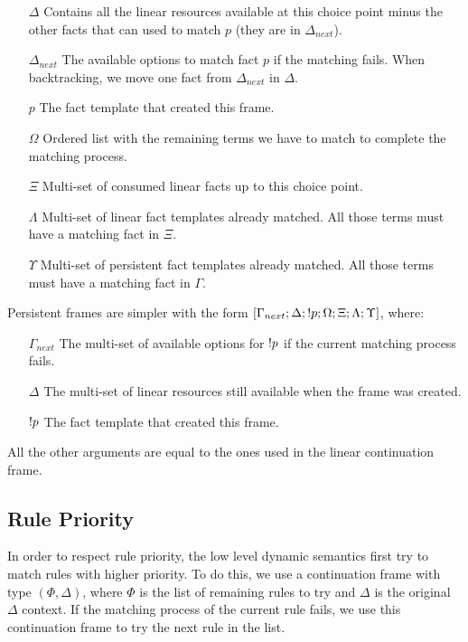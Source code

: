 \begin{enumerate}
   \item[$\Delta$] Contains all the linear resources available at this choice point minus the other facts that can used to match $p$ (they are in $\Delta_{next}$).
   \item[$\Delta_{next}$] The available options to match fact $p$ if the matching fails. When backtracking, we move one fact from $\Delta_{next}$ in $\Delta$.
   \item[$p$] The fact template that created this frame.
   \item[$\Omega$] Ordered list with the remaining terms we have to match to complete the matching process.
   \item[$\Xi$] Multi-set of consumed linear facts up to this choice point.
   \item[$\Lambda$] Multi-set of linear fact templates already matched. All those terms must have a matching fact in $\Xi$.
   \item[$\Upsilon$] Multi-set of persistent fact templates already matched. All those terms must have a matching fact in $\Gamma$.
\end{enumerate}

Persistent frames are simpler with the form $[\Gamma_{next}; \Delta; {!} p; \Omega; \Xi; \Lambda; \Upsilon]$, where:

\begin{enumerate}
   \item[$\Gamma_{next}$] The multi-set of available options for ${!} p$ if the current matching process fails.
   \item[$\Delta$] The multi-set of linear resources still available when the frame was created.
   \item[${!} p$] The fact template that created this frame.
\end{enumerate}

All the other arguments are equal to the ones used in the linear continuation frame.

\subsection{Rule Priority}

In order to respect rule priority, the low level dynamic semantics first try to match rules with
higher priority. To do this, we use a continuation frame with type $(\Phi, \Delta)$, where $\Phi$
is the list of remaining rules to try and $\Delta$ is the original $\Delta$ context. If the matching
process of the current rule fails, we use this continuation frame to try the next rule in the list.

